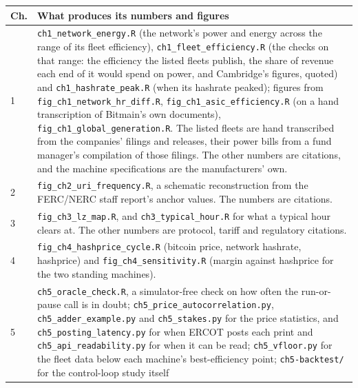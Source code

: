 \renewcommand{\thetable}{A.\arabic{table}}\setcounter{table}{0}
\begin{table}[htbp]
  \centering
  \scriptsize
  \setlength{\tabcolsep}{3.5pt}
  \begin{tabular}{@{}p{11mm}p{88mm}@{}}
    \hline
    \textbf{Ch.} & \textbf{What produces its numbers and figures} \\
    \hline
    1 & \texttt{ch1\_network\_energy.R} (the network's power and energy across
        the range of its fleet efficiency), \texttt{ch1\_fleet\_efficiency.R}
        (the checks on that range: the efficiency the listed fleets
        publish, the share of revenue each end of it would spend on power, and
        Cambridge's figures, quoted) and
        \texttt{ch1\_hashrate\_peak.R} (when its hashrate peaked); figures from
        \texttt{fig\_ch1\_network\_hr\_diff.R},
        \texttt{fig\_ch1\_asic\_efficiency.R} (on a hand transcription of
        Bitmain's own documents), \texttt{fig\_ch1\_global\_generation.R}. The
        listed fleets are hand transcribed from the companies' filings and
        releases, their power bills from a fund manager's compilation of
        those filings. The other numbers are citations, and
        the machine specifications are the manufacturers' own. \\
    2 & \texttt{fig\_ch2\_uri\_frequency.R}, a schematic reconstruction from the
        FERC/NERC staff report's anchor values. The numbers are citations. \\
    3 & \texttt{fig\_ch3\_lz\_map.R}, and \texttt{ch3\_typical\_hour.R} for
        what a typical hour clears at. The other numbers are protocol, tariff
        and regulatory citations. \\
    4 & \texttt{fig\_ch4\_hashprice\_cycle.R} (bitcoin price, network hashrate,
        hashprice) and \texttt{fig\_ch4\_sensitivity.R} (margin against
        hashprice for the two standing machines). \\
    5 & \texttt{ch5\_oracle\_check.R}, a simulator-free check on how often
        the run-or-pause call is in doubt; \texttt{ch5\_price\_autocorrelation.py},
        \texttt{ch5\_adder\_example.py} and \texttt{ch5\_stakes.py} for the
        price statistics, and \texttt{ch5\_posting\_latency.py} for when ERCOT
        posts each print and \texttt{ch5\_api\_readability.py} for when it can be read; \texttt{ch5\_vfloor.py} for the fleet data below each
        machine's best-efficiency point; \texttt{ch5-backtest/} for the control-loop study itself

\end{tabular}
\end{table}
